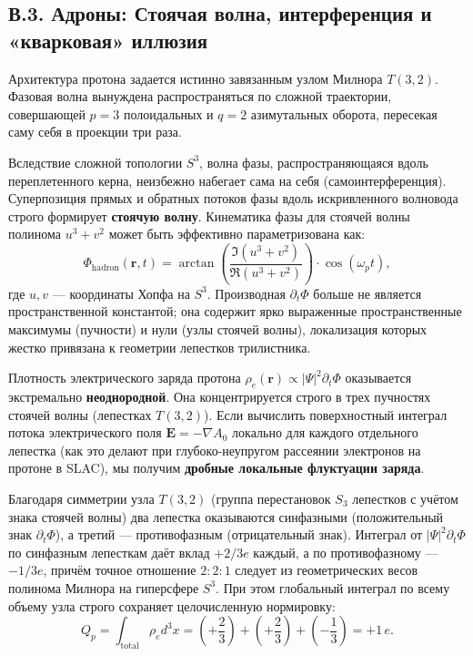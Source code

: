 \documentclass[11pt,a4paper]{article}
\begin{document}
	\subsection*{В.3. Адроны: Стоячая волна, интерференция и «кварковая» иллюзия}
	Архитектура протона задается истинно завязанным узлом Милнора $T(3,2)$. Фазовая волна вынуждена распространяться по сложной траектории, совершающей $p=3$ полоидальных и $q=2$ азимутальных оборота, пересекая саму себя в проекции три раза.
	
	Вследствие сложной топологии $S^3$, волна фазы, распространяющаяся вдоль переплетенного керна, неизбежно набегает сама на себя (самоинтерференция). Суперпозиция прямых и обратных потоков фазы вдоль искривленного волновода строго формирует \textbf{стоячую волну}. Кинематика фазы для стоячей волны полинома $u^3 + v^2$ может быть эффективно параметризована как:
	\begin{equation}
		\Phi_{\text{hadron}}(\mathbf{r}, t) = \arctan\!\left(\frac{\Im(u^3 + v^2)}{\Re(u^3 + v^2)}\right) \cdot \cos(\omega_p t),
	\end{equation}
	где $u, v$ — координаты Хопфа на $S^3$. Производная $\partial_t \Phi$ больше не является пространственной константой; она содержит ярко выраженные пространственные максимумы (пучности) и нули (узлы стоячей волны), локализация которых жестко привязана к геометрии лепестков трилистника.
	
	Плотность электрического заряда протона $\rho_e(\mathbf{r}) \propto |\Psi|^2 \partial_t \Phi$ оказывается экстремально \textbf{неоднородной}. Она концентрируется строго в трех пучностях стоячей волны (лепестках $T(3,2)$). 
	Если вычислить поверхностный интеграл потока электрического поля $\mathbf{E} = -\nabla A_0$ локально для каждого отдельного лепестка (как это делают при глубоко-неупругом рассеянии электронов на протоне в SLAC), мы получим \textbf{дробные локальные флуктуации заряда}. 
	
	Благодаря симметрии узла $T(3,2)$ (группа перестановок $S_3$ лепестков с учётом знака стоячей волны) два лепестка оказываются синфазными (положительный знак $\partial_t \Phi$), а третий — противофазным (отрицательный знак). Интеграл от $|\Psi|^2 \partial_t \Phi$ по синфазным лепесткам даёт вклад $+2/3 e$ каждый, а по противофазному — $-1/3 e$, причём точное отношение $2:2:1$ следует из геометрических весов полинома Милнора на гиперсфере $S^3$. При этом глобальный интеграл по всему объему узла строго сохраняет целочисленную нормировку:
	\begin{equation}
		Q_p = \int_{\text{total}} \rho_e d^3x = \left(+\frac{2}{3}\right) + \left(+\frac{2}{3}\right) + \left(-\frac{1}{3}\right) = +1\,e.
	\end{equation}
	
\end{document}

